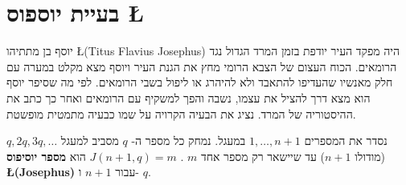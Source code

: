 
\section{ בעיית יוספוס \L{\normalsize}}\label{s.josephus}

יוסף בן מתתיהו 
\L{(Titus Flavius Josephus)}
היה מפקד העיר יודפת בזמן המרד הגדול נגד הרומאים. הכוח העצום של הצבא הרומי מחץ את הגנת העיר ויוסף מצא מקלט במערה עם חלק מאנשיו שהעדיפו להתאבד ולא להיהרג או ליפול בשבי הרומאים. לפי מה שסיפר יוסף הוא מצא דרך להציל את עצמו, נשבה והפך למשקיף עם הרומאים ואחר כך כתב את ההיסטוריה של המרד. נציג את הבעיה הקרויה על שמו כבעיה מתמטית מופשטת.
\begin{definition}
נסדר את המספרים
$1,\ldots,n\!+\!1$
במעגל. נמחק כל מספר ה-%
$q$
מסביב למעגל
$q, 2q, 3q, \ldots$
(מודולו
$n\!+\!1$)
עד שיישאר רק מספר אחד 
$m$
.
$J(n+1,q)=m$
הוא
\textbf{מספר יוסיפוס \L{(Josephus)}}
עבור
$n+1$
ו-%
$q$.
\end{definition}
